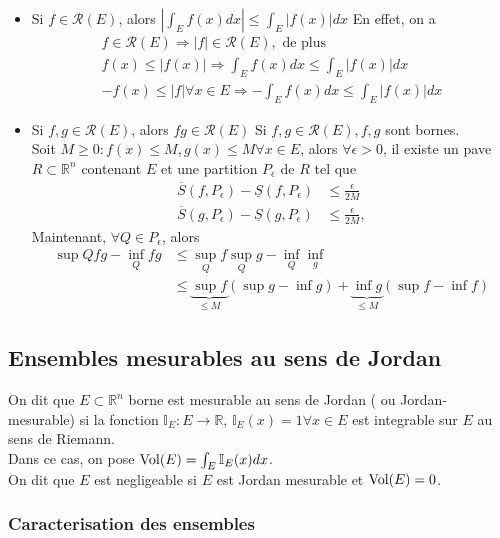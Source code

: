 \documentclass[../main.tex]{subfiles}
\begin{document}
\begin{itemize}
\item Si $f \in \mathcal{R}( E)$, alors $| \int_E f( x) dx | \leq  \int_E |f( x) | dx$ 
	En effet, on a 
	\begin{align*}
	f \in \mathcal{R}( E) \Rightarrow |f| \in \mathcal{R}( E) , \text{ de plus } \\
	f( x) \leq  |f( x) | \Rightarrow  \int_E f( x) dx \leq  \int_E |f( x) | dx	\\
	- f( x) \leq  |f| \forall x \in E\Rightarrow  -\int_E f( x) dx \leq  \int_E |f( x) | dx
	\end{align*}
\item Si $f,g \in \mathcal{R}( E) $, alors $fg \in \mathcal{R}( E) $
	Si $f,g \in \mathcal{R}( E) , f,g$ sont bornes.\\
	Soit $M \geq 0: f( x) \leq  M, g( x) \leq  M\forall x \in E$, alors $\forall \epsilon>0$, il existe un pave $R \subset \mathbb{R}^n$ contenant $E$ et une partition $P_\epsilon$ de $R$ tel que
	\begin{align*}
		\overline{S}( f,P_\epsilon) - \underline { S} ( f,P_\epsilon) &\leq  \frac{\epsilon}{2M}\\
	\overline{S}( g,P_\epsilon) - \underline { S} ( g,P_\epsilon) &\leq  \frac{\epsilon}{2M}, 	
	\end{align*}
	Maintenant, $\forall Q \in P_\epsilon$, alors
	\begin{align*}
		\sup Q fg - \inf_Q fg &\leq  \sup_Q f \sup_Q g - \inf_Q \inf_g\\
				      & \leq \underbrace{\sup f}_{ \leq M} ( \sup g - \inf g) + \underbrace{\inf g}_{ \leq M} ( \sup f - \inf f) 
	\end{align*}
\end{itemize}
\subsection{Ensembles mesurables au sens de Jordan}
\begin{defn}
	On dit que $E \subset \mathbb{R}^n$ borne est mesurable au sens de Jordan ( ou Jordan-mesurable) si la fonction $ \mathbb{I}_E: E \to \mathbb{R}$, $ \mathbb{I}_E ( x) =1 \forall x \in E$ est integrable sur $E$ au sens de Riemann.\\
	Dans ce cas, on pose $\operatorname*{Vol}( E) = \int_E \mathbb{I}_E( x) dx$.\\
	On dit que $E$ est negligeable si $E$ est Jordan mesurable et $\operatorname*{Vol} ( E) =0 $.
\end{defn}
\subsubsection{Caracterisation des ensembles}
\end{document}

